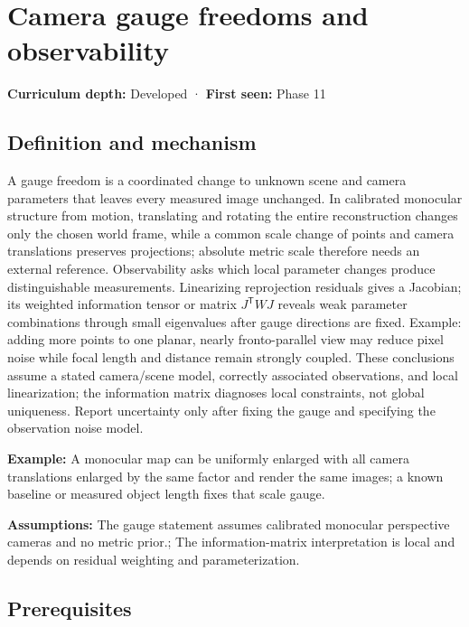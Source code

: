\hypertarget{appendix-113f0267e5f4}{}\label{referencestart:appendix-113f0267e5f4}
\section{Camera gauge freedoms and observability}\label{appendix-113f0267e5f4-camera-gauge-freedoms-and-observability}

\textbf{Curriculum depth:} Developed · \textbf{First seen:} Phase 11

\subsection{Definition and mechanism}\label{appendix-113f0267e5f4-definition-and-mechanism}

A gauge freedom is a coordinated change to unknown scene and camera parameters that leaves every measured image unchanged. In calibrated monocular structure from motion, translating and rotating the entire reconstruction changes only the chosen world frame, while a common scale change of points and camera translations preserves projections; absolute metric scale therefore needs an external reference. Observability asks which local parameter changes produce distinguishable measurements. Linearizing reprojection residuals gives a Jacobian; its weighted information tensor or matrix \(J^{\mathsf T}WJ\) reveals weak parameter combinations through small eigenvalues after gauge directions are fixed. Example: adding more points to one planar, nearly fronto-parallel view may reduce pixel noise while focal length and distance remain strongly coupled. These conclusions assume a stated camera/scene model, correctly associated observations, and local linearization; the information matrix diagnoses local constraints, not global uniqueness. Report uncertainty only after fixing the gauge and specifying the observation noise model.

\textbf{Example:} A monocular map can be uniformly enlarged with all camera translations enlarged by the same factor and render the same images; a known baseline or measured object length fixes that scale gauge.

\textbf{Assumptions:} The gauge statement assumes calibrated monocular perspective cameras and no metric prior.; The information-matrix interpretation is local and depends on residual weighting and parameterization.

\subsection{Prerequisites}\label{appendix-113f0267e5f4-prerequisites}

